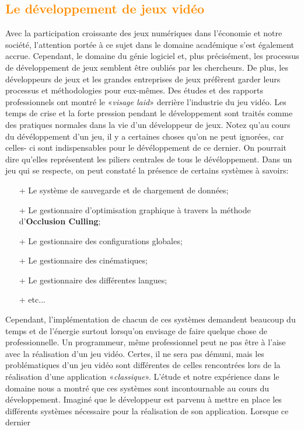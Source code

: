 \documentclass[ebook, 8pt, oneside, openany]{memoir}
\begin{document}
	\subsection{\textcolor{darkorange}{Le développement de jeux vidéo}}
	Avec la participation croissante des jeux numériques dans l'économie et notre société, l'attention 
	portée à ce sujet dans le domaine académique s'est également accrue. Cependant, le domaine du génie
	logiciel et, plus précisément, les processus de développement de jeux semblent être oubliés par les
	chercheurs. De plus, les développeurs de jeux et les grandes entreprises de jeux préfèrent garder leurs
	processus et méthodologies pour eux-mêmes. Des études et des rapports professionnels ont montré le 
	«\textit{visage laid}» derrière l'industrie du jeu vidéo. Les temps de crise et la forte pression
	pendant le développement sont traités comme des pratiques normales dans la vie d'un développeur de jeux.
	Notez qu'au cours du dévéloppement d'un jeu, il y a certaines choses qu'on ne peut ignorées, car celles-
	ci sont indispensables pour le dévéloppement de ce dernier. On pourrait dire qu'elles représentent les
	piliers centrales de tous le dévéloppement. Dans un jeu qui se respecte, on peut constaté la présence de
	certains systèmes à savoirs:
	\begin{itemize}
		\item[+] Le système de sauvegarde et de chargement de données;
		\item[+] Le gestionnaire d'optimisation graphique à travers la méthode d'\textbf{Occlusion Culling};
		\item[+] Le gestionnaire des configurations globales;
		\item[+] Le gestionnaire des cinématiques;
		\item[+] Le gestionnaire des différentes langues;
		\item[+] etc...
	\end{itemize}
	Cependant, l'implémentation de chacun de ces systèmes demandent beaucoup du temps et de l'énergie
	surtout lorsqu'on envisage de faire quelque chose de professionnelle. Un programmeur, même professionnel 
	peut ne pas être à l’aise avec la réalisation d’un jeu vidéo. Certes, il ne sera pas démuni, mais les 
	problématiques d’un jeu vidéo sont différentes de celles rencontrées lors de la réalisation d’une 
	application «\textit{classique}». L'étude et notre expérience dans le domaine nous a montré que ces 
	systèmes sont incontournable au cours du développement. Imaginé que le développeur est parvenu à mettre 
	en place les différents systèmes nécessaire pour la réalisation de son application. Lorsque ce dernier 
\end{document}
